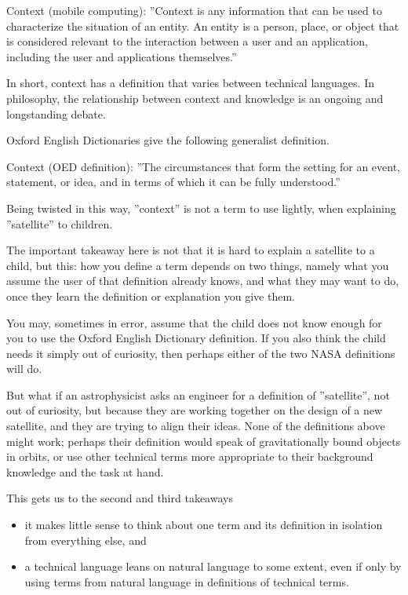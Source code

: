\documentclass[graybox,envcountchap,sectrefs]{svmono}
\begin{document}
\begin{svgraybox}
Context (mobile computing): ''Context is any information that can be used to characterize the situation of an entity. An entity is a person, place, or object that is considered relevant to the interaction between a user and an application, including the user and applications themselves.'' \cite{abowd1999towards}
\end{svgraybox}

In short, context has a definition that varies between technical languages. In philosophy, the relationship between context and knowledge is an ongoing and longstanding debate.\cite{Rysiew2016}

Oxford English Dictionaries give the following generalist definition.

\begin{svgraybox}
Context (OED definition): ''The circumstances that form the setting for an event, statement, or idea, and in terms of which it can be fully understood.'' \cite{def-context}
\end{svgraybox}

Being twisted in this way, ''context'' is not a term to use lightly, when explaining ''satellite'' to children.

The important takeaway here is not that it is hard to explain a satellite to a child, but this: how you define a term depends on two things, namely
what you assume the user of that definition already knows, and
what they may want to do, once they learn the definition or explanation you give them.

You may, sometimes in error, assume that the child does not know enough for you to use the Oxford English Dictionary definition. If you also think the child needs it simply out of curiosity, then perhaps either of the two NASA definitions will do.

But what if an astrophysicist asks an engineer for a definition of ''satellite'', not out of curiosity, but because they are working together on the design of a new satellite, and they are trying to align their ideas. None of the definitions above might work; perhaps their definition would speak of gravitationally bound objects in orbits, or use other technical terms more appropriate to their background knowledge and the task at hand.

This gets us to the second and third takeaways
\begin{itemize}
	\item it makes little sense to think about one term and its definition in isolation from everything else, and
	\item a technical language leans on natural language to some extent, even if only by using terms from natural language in definitions of technical terms.
\end{itemize}
\end{document}
